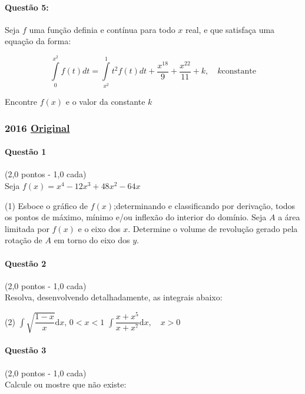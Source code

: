 \documentclass[12pt,a4paper]{article}
\newcommand{\dd}{\mathrm{d}}
\newcommand{\original}[1]{\tiny \href{#1}{Original} \normalsize}
\begin{document}
\paragraph{Questão 5: }

Seja $f$ uma função definia e contínua para todo $x$ real, e que satisfaça uma equação da forma:

$$\int \limits_{0}^{x^2} f(t)dt = \int \limits_{x^2}^{1}t^2f(t)dt + \dfrac{x^{18}}{9} + \dfrac{x^{22}}{11} + k,\quad k \mathrm{ constante}$$

Encontre $f(x)$ e o valor da constante $k$

\newpage
\subsubsection{2016 \original{https://drive.google.com/open?id=1ESpK2hK5nsNpZ4kRFSCM46KtiSG1s3vX}}

\paragraph{Questão 1} (2,0 pontos - 1,0 cada)\\
Seja $f(x) = x^4 - 12x^3 + 48x^2 - 64x$

\begin{tasks}(1)
\task Esboce o gráfico de $f(x)$;determinando e classificando por derivação, todos os pontos de máximo, mínimo e/ou inflexão do interior do domínio.
\task Seja $A$ a área limitada por $f(x)$ e o eixo dos $x$. Determine o volume de revolução gerado pela rotação de $A$ em torno do eixo dos $y$.
\end{tasks}

\paragraph{Questão 2} (2,0 pontos - 1,0 cada)\\
Resolva, desenvolvendo detalhadamente, as integrais abaixo:

\begin{tasks}(2)
\task $\displaystyle\int \sqrt{\dfrac{1-x}{x}}\dd x,\, 0<x<1$
\task $\displaystyle\int \dfrac{x+x^5}{x+x^7}\dd x,\quad x>0$
\end{tasks}

\paragraph{Questão 3} (2,0 pontos - 1,0 cada)\\
Calcule ou mostre que não existe:
\end{document}
